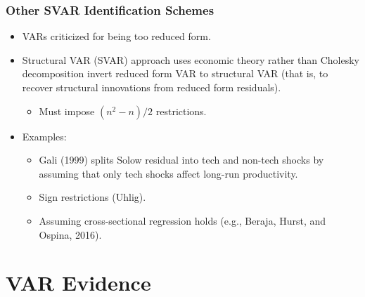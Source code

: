 \documentclass[english,xcolor=svgnames]{beamer}
\begin{document}
\begin{frame}
\frametitle{Other SVAR Identification Schemes
}
\begin{itemize}
	\item VARs criticized for being too reduced form.
	\item Structural VAR (SVAR) approach uses economic theory rather than Cholesky decomposition invert reduced form VAR to structural VAR (that is, to recover structural innovations from reduced form residuals).
	\begin{itemize}
		\item Must impose $(n^2-n)/2$ restrictions.
	\end{itemize}
	\item Examples:
	\begin{itemize}
		\item Gali (1999) splits Solow residual into tech and non-tech shocks by assuming that only tech shocks affect long-run productivity.
		\item Sign restrictions (Uhlig).
		\item Assuming cross-sectional regression holds
(e.g., Beraja, Hurst, and Ospina, 2016).
	\end{itemize}
\end{itemize}
\end{frame}

\section{VAR Evidence}
\end{document}
